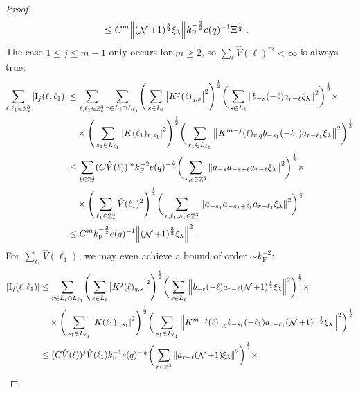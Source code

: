 \documentclass[12pt,a4paper]{article}
\numberwithin{equation}{section}
\newcommand{\1}{\mathbb{I}}
\newcommand{\F}{\mathrm{F}}
\newcommand{\I}{\mathrm{I}}
\DeclareMathOperator{\Z}{\mathbb{Z}}
\DeclareMathOperator{\NN}{\mathcal{N}}
\newcommand{\half}{\frac{1}{2}}
\theoremstyle{plain}
\theoremstyle{definition}
\theoremstyle{remark}
\theoremstyle{plain}
\theoremstyle{definition}
\theoremstyle{remark}
\begin{document}
\begin{proof}
{\begin{align}
 	&\leq C^m \norm{ (\NN+1)^{\frac 52}\xi_\lambda}
 		k_{\F}^{-\frac 32} e(q)^{-1} \Xi^{\half} \;. \label{eq:estEQ2111} 
\end{align}}
The case $ 1 \le j \le m-1 $ only occurs for $ m \ge 2 $, so $ \sum_\ell \hat{V}(\ell)^m < \infty $ is always true:
\textcolor{green!30!black}{
\begin{align}
	\sum_{\ell,\ell_1 \in \Z^3_*} |\I_j(\ell, \ell_1)|
	&\leq \sum_{\ell,\ell_1 \in \Z^3_*} \sum\limits_{r\in L_{\ell} \cap L_{\ell_1}}\! \Bigg( \sum\limits_{s \in L_\ell} \abs{K^{j}(\ell)_{q,s}}^2\Bigg)^\half \bigg( \sum\limits_{s \in L_\ell}\norm{b_{-s}(-\ell) a_{r-\ell} \xi_\lambda}^2\bigg)^\half \times\nonumber\\
		&\quad \times \Bigg( \sum\limits_{s_1 \in L_{\ell_1}}\abs{K(\ell_1)_{r,s_1}}^2\Bigg)^\half \bigg(\sum\limits_{s_1 \in L_{\ell_1}}\norm{ K^{m-j}(\ell)_{r,q} b_{-s_1}(-\ell_1)  a_{r-\ell_1} \xi_\lambda }^2\bigg)^\half
	\nonumber\\
	&\leq \sum_{\ell \in \Z^3_*} (C \hat{V}(\ell))^m
		k_{\F}^{-2} e(q)^{-\frac 32}
		\bigg( \sum\limits_{r, s\in \Z^3} \norm{ a_{-s} a_{-s+\ell} a_{r-\ell} \xi_\lambda}^2\bigg)^\half \times \nonumber\\
		&\quad \times 
		\Bigg( \sum_{\ell_1 \in \Z^3_*} \hat{V}(\ell_1)^2 \Bigg)^{\half}
	\bigg(
		\sum\limits_{r, \ell_1, s_1 \in \Z^3} \norm{ a_{-s_1} a_{-s_1 + \ell_1} a_{r-\ell_1} \xi_\lambda }^2\bigg)^\half
	\nonumber\\
	&\leq C^m k_{\F}^{-\frac 32} e(q)^{-1}
	\norm{ (\NN+1)^{\frac 32} \xi_\lambda}^2 \;. \label{eq:estEQ2112_Coulomb}
\end{align}
For $ \sum_{\ell_1} \hat{V}(\ell_1) $, we may even achieve a bound of order $ \sim k_{\F}^{-2} $:}
\begin{align}
	|\I_j(\ell, \ell_1)|
	&\leq \sum\limits_{r\in L_{\ell} \cap L_{\ell_1}}\! \Bigg( \sum\limits_{s \in L_\ell} \abs{K^{j}(\ell)_{q,s}}^2\Bigg)^\half \bigg( \sum\limits_{s \in L_\ell}\norm{b_{-s}(-\ell) a_{r-\ell} (\NN+1)^{\half}\xi_\lambda}^2\bigg)^\half \times\nonumber\\
		&\quad \times \Bigg( \sum\limits_{s_1 \in L_{\ell_1}}\abs{K(\ell_1)_{r,s_1}}^2\Bigg)^\half \bigg(\sum\limits_{s_1 \in L_{\ell_1}}\norm{ K^{m-j}(\ell)_{r,q} b_{-s_1}(-\ell_1)  a_{r-\ell_1} (\NN+1)^{-\half}\xi_\lambda }^2\bigg)^\half
	\nonumber\\
	&\leq (C \hat{V}(\ell))^j \hat{V}(\ell_1) k_{\F}^{-1} e(q)^{-\half}
	\bigg( \sum\limits_{r\in \Z^3} \norm{ a_{r-\ell} (\NN+1) \xi_\lambda}^2\bigg)^\half \times \nonumber\\

\end{align}
\end{proof}
\end{document}
